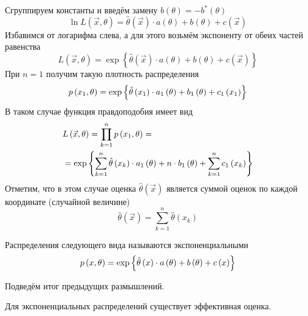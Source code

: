 Сгруппируем константы и введём замену
$b\left( \theta \right)=-b^*\left( \theta \right)$
\begin{equation*}
  \ln{L\left( \vec{x}, \theta \right)}
  = \hat{\theta}\left( \vec{x} \right)\cdot a\left( \theta \right)
    +b\left( \theta \right) + c\left( \vec{x} \right)
\end{equation*}
Избавимся от логарифма слева, а для этого возьмём экспоненту от обеих частей
равенства
\begin{equation*}
  L\left( \vec{x}, \theta \right)
  = \exp{\left\{\hat{\theta}\left( \vec{x} \right)\cdot a\left( \theta \right)
    + b\left( \theta \right) + c\left( \vec{x} \right)\right\}}
\end{equation*}
При $n = 1$ получим такую плотность распределения
\begin{equation*}
  p\left(x_1,\theta\right)
  = \exp{\left\{\hat{\theta}\left( x_1 \right) \cdot a_1\left( \theta \right)
    + b_1\left( \theta \right) + c_1\left( x_1 \right)\right\}}
\end{equation*}
В таком случае функция правдоподобия имеет вид
\begin{align*}
  &L\left( \vec{x},\theta \right)
  = \prod_{k=1}^np\left(x_1,\theta\right)= \\
  &= \exp{\left\{\sum_{k=1}^n \hat{\theta}\left(x_k\right)\cdot a_1\left(\theta\right)
    +n \cdot b_1\left( \theta \right)
    + \sum_{k=1}^n c_1\left( x_k \right)\right\}}
\end{align*}
Отметим, что в этом случае оценка $\hat{\theta}\left( \vec{x} \right)$
является суммой оценок по каждой координате (случайной величине)
\begin{equation*}
  \hat{\theta}\left( \vec{x} \right)
  = \sum_{k=1}^n \hat{\theta}\left( x_k \right)
\end{equation*}

\begin{definition}
  \label{def:exponentialDistribution}
  Распределения следующего вида называются экспоненциальными
  $$p\left(x,\theta\right)
    = \exp{\left\{\hat{\theta}\left(x\right)\cdot a\left(\theta\right)
      +b\left( \theta \right)+c\left( x \right)\right\}}$$
\end{definition}

Подведём итог предыдущих размышлений.

\begin{affirmation}
  \label{affirmation:efficientEstimator:exponentialExsistance}
  Для экспоненциальных распределений существует эффективная оценка.
\end{affirmation}

